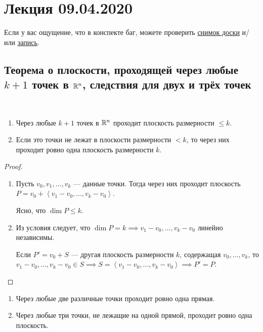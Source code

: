 \section{Лекция 09.04.2020} 

Если у вас ощущение, что в конспекте баг, можете проверить \href{https://www.dropbox.com/s/fty6fb2vuyugzdk/LA_19-20_osn_Lecture26.svg?dl=0}{снимок доски} и/или \href{https://youtu.be/U-UZGNDM1SA}{запись}.

\subsection{Теорема о плоскости, проходящей через любые $k+1$ точек в $\mathbb{R}^n$, следствия для двух и трёх точек}

\begin{theorem}~
    \begin{enumerate}[label=\alph*)]
    \item Через любые $k + 1$ точек в $\mathbb{R}^n$ проходит плоскость размерности $\leq k$.
    \item Если это точки не лежат в плоскости размерности $<k$, то через них проходит ровно одна плоскость размерности $k$.
    \end{enumerate}
\end{theorem}

\begin{proof}~
    \begin{enumerate}[label=\alph*)]
        \item Пусть $v_0, v_1, \dots, v_k$ --- данные точки. Тогда через них проходит плоскость $P = v_0 + \left< v_1 - v_0, \dots, v_k - v_0 \right>$.

            Ясно, что $\dim P \leq k$.

        \item Из условия следует, что $\dim P = k \implies v_1 - v_0, \dots, v_k - v_0$ линейно независимы.

            Если $P' = v_0 + S$ --- другая плоскость размерности $k$, содержащая $v_0, \dots, v_k$, то $v_1 - v_0, \dots, v_k - v_0 \in S \implies S = \left< v_1 - v_0, \dots, v_k - v_0 \right> \implies P' = P$.
            \qedhere
    \end{enumerate}
\end{proof}

\begin{corollary}
    \begin{enumerate}
    \item Через любые две различные точки проходит ровно одна прямая.
    \item Через любые три точки, не лежащие на одной прямой, проходит ровно одна плоскость.
    \end{enumerate}
\end{corollary}


